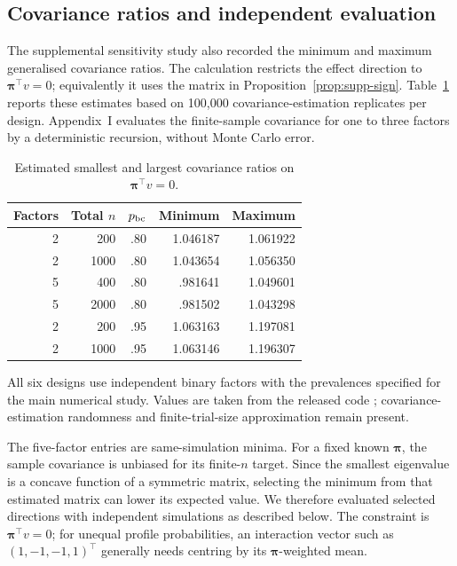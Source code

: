 \documentclass[12pt,a4paper]{article}
\theoremstyle{definition}
\theoremstyle{remark}\newtheorem{remark}{Remark}
\numberwithin{equation}{section}
\begin{document}
\clearpage
\subsection{Covariance ratios and independent evaluation}\label{sec:supp-eigen-diagnostics}\label{sec:supp-independent-directions}
The supplemental sensitivity study also recorded the minimum and maximum generalised covariance ratios. The calculation restricts the effect direction to $\bm\pi^\top v=0$; equivalently it uses the matrix in Proposition~\ref{prop:supp-sign}. Table~\ref{tab:supp-eigen-diagnostics} reports these estimates based on 100,000 covariance-estimation replicates per design. Appendix~I evaluates the finite-sample covariance for one to three factors by a deterministic recursion, without Monte Carlo error.
\begin{table}[!htbp]
\centering
\caption{Estimated smallest and largest covariance ratios on $\bm\pi^\top v=0$.}
\label{tab:supp-eigen-diagnostics}
\begin{threeparttable}
\begin{singlespace}
\begin{tabular}{rrrrr}
\toprule
Factors & Total $n$ & $p_{\rm bc}$ & Minimum & Maximum\\
\midrule
2 & 200 & .80 & 1.046187 & 1.061922\\
2 & 1000 & .80 & 1.043654 & 1.056350\\
5 & 400 & .80 & .981641 & 1.049601\\
5 & 2000 & .80 & .981502 & 1.043298\\
2 & 200 & .95 & 1.063163 & 1.197081\\
2 & 1000 & .95 & 1.063146 & 1.196307\\
\bottomrule
\end{tabular}
\begin{tablenotes}[flushleft]\small
\item All six designs use independent binary factors with the prevalences specified for the main numerical study. Values are taken from the released code \citep{KojimaSIGA2026}; covariance-estimation randomness and finite-trial-size approximation remain present.
\end{tablenotes}
\end{singlespace}
\end{threeparttable}
\end{table}
The five-factor entries are same-simulation minima. For a fixed known $\bm\pi$, the sample covariance is unbiased for its finite-$n$ target. Since the smallest eigenvalue is a concave function of a symmetric matrix, selecting the minimum from that estimated matrix can lower its expected value. We therefore evaluated selected directions with independent simulations as described below. The constraint is $\bm\pi^\top v=0$; for unequal profile probabilities, an interaction vector such as $(1,-1,-1,1)^\top$ generally needs centring by its $\bm\pi$-weighted mean.
\end{document}
